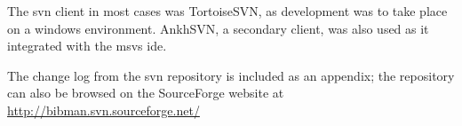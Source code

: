 The \gls{svn} client in most cases was TortoiseSVN, as development was to take place on a windows environment.  AnkhSVN, a secondary client, was also used as it integrated with the \gls{msvs} \gls{ide}. 

The change log from the \gls{svn} repository is included as an appendix\revisit; the repository can also be browsed on the SourceForge website at \url{http://bibman.svn.sourceforge.net/}

